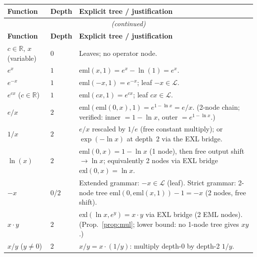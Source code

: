 \documentclass[12pt,a4paper]{article}
\theoremstyle{definition}
\theoremstyle{remark}
\begin{document}
\begin{longtable}{@{}llp{8cm}@{}}
\toprule
\textbf{Function} & \textbf{Depth} & \textbf{Explicit tree / justification} \\
\midrule
\endfirsthead
\multicolumn{3}{c}{\textit{(continued)}} \\
\toprule
\textbf{Function} & \textbf{Depth} & \textbf{Explicit tree / justification} \\
\midrule
\endhead
\bottomrule
\endlastfoot

$c \in \mathbb{R}$, $x$ (variable)
  & $0$
  & Leaves; no operator node. \\[4pt]

$e^x$
  & $1$
  & $\mathrm{eml}(x,1) = e^x - \ln(1) = e^x$. \\[2pt]

$e^{-x}$
  & $1$
  & $\mathrm{eml}(-x,1) = e^{-x}$; leaf $-x \in \mathcal{L}$. \\[2pt]

$e^{cx}$ ($c \in \mathbb{R}$)
  & $1$
  & $\mathrm{eml}(cx,1) = e^{cx}$; leaf $cx \in \mathcal{L}$. \\[4pt]

$e/x$
  & $2$
  & $\mathrm{eml}(\mathrm{eml}(0,x),1) = e^{1-\ln x} = e/x$.
    (2-node chain; verified: inner $= 1-\ln x$, outer $= e^{1-\ln x}$.) \\[2pt]

$1/x$
  & $2$
  & $e/x$ rescaled by $1/e$ (free constant multiply);
    or $\exp(-\ln x)$ at depth~2 via the EXL bridge. \\[2pt]

$\ln(x)$
  & $2$
  & $\mathrm{eml}(0,x) = 1-\ln x$ (1 node), then free output shift $\to \ln x$;
    equivalently 2 nodes via EXL bridge $\mathrm{exl}(0,x) = \ln x$. \\[2pt]

$-x$
  & $0$/$2$
  & Extended grammar: $-x \in \mathcal{L}$ (leaf). Strict grammar: 2-node tree
    $\mathrm{eml}(0,\mathrm{eml}(x,1)) - 1 = -x$ (2 nodes, free shift). \\[2pt]

$x \cdot y$
  & $2$
  & $\mathrm{exl}(\ln x, e^y) = x \cdot y$ via EXL bridge (2 EML nodes).
    (Prop.~\ref{prop:mul}; lower bound: no 1-node tree gives $xy$.) \\[2pt]

$x/y$ ($y \neq 0$)
  & $2$
  & $x/y = x \cdot (1/y)$: multiply depth-0 by depth-2 $1/y$. \\[4pt]


\end{longtable}
\end{document}
